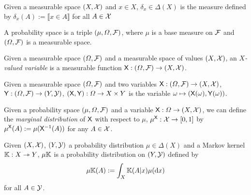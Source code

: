 \begin{definition}
Given a measurable space $(X,\mathcal{X})$ and $x\in X$, $\delta_x\in \Delta(X)$ is the measure defined by $\delta_x(A):=\llbracket x\in A \rrbracket$ for all $A\in \mathcal{X}$
\end{definition}

\begin{definition}
A probability space is a triple $(\mu,\Omega,\mathcal{F})$, where $\mu$ is a base measure on $\mathcal{F}$ and $(\Omega,\mathcal{F})$ is a measurable space.
\end{definition}

\begin{definition}[Variable]
Given a measurable space $(\Omega,\mathcal{F})$ and a measurable space of values $(X,\mathcal{X})$, an \emph{$X$-valued variable} is a measurable function $\mathsf{X}:(\Omega,\mathcal{F})\to (X,\mathcal{X})$.
\end{definition}

\begin{definition}
Given a measurable space $(\Omega,\mathcal{F})$ and two variables $\mathsf{X}:(\Omega,\mathcal{F})\to (X,\mathcal{X})$, $\mathsf{Y}:(\Omega,\mathcal{F})\to (Y,\mathcal{Y})$, $(\mathsf{X},\mathsf{Y}):\Omega\to X\times Y$ is the variable $\omega\mapsto (\mathsf{X}(\omega),\mathsf{Y}(\omega))$.
\end{definition}

\begin{definition}\label{def:pushforward}
Given a probability space $(\mu,\Omega,\mathcal{F})$ and a variable $\mathsf{X}:\Omega\to (X,\mathcal{X})$, we can define the \emph{marginal distribution} of $\mathsf{X}$ with respect to $\mu$, $\mu^{\mathsf{X}}:\mathcal{X}\to [0,1]$ by $\mu^{\mathsf{X}}(A):=\mu(\mathsf{X}^{-1}(A))$ for any $A\in \mathcal{X}$.
\end{definition}

\begin{definition}
Given $(X,\mathcal{X})$, $(Y,\mathcal{Y})$ a probability distribution $\mu\in \Delta(X)$ and a Markov kernel $\mathbb{K}:X\rightarrowtriangle Y$, $\mu\mathbb{K}$ is a probability distribution on $(Y,\mathcal{Y})$ defined by
\begin{align}
	\mu\mathbb{K}(A):= \int_{X} \mathbb{K}(A|x)\mu(\mathrm{d}x)
\end{align}
for all $A\in \mathcal{Y}$.
\end{definition}

